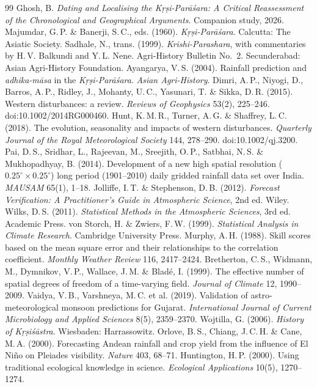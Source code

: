 \documentclass[11pt,a4paper]{article}
\newcommand{\skt}[1]{\textcolor{skt}{\textit{#1}}}
\begin{document}
\begin{thebibliography}{99}\small
{} Ghosh, B. \textit{Dating and Localising the Kṛṣi-Parāśara: A Critical Reassessment of the Chronological and Geographical Arguments}. Companion study, 2026.
 Majumdar, G.\,P. \& Banerji, S.\,C., eds. (1960). \textit{Kṛṣi-Parāśara}. Calcutta: The Asiatic Society.
 Sadhale, N., trans. (1999). \textit{Krishi-Parashara}, with commentaries by H.\,V. Balkundi and Y.\,L. Nene. Agri-History Bulletin No.~2. Secunderabad: Asian Agri-History Foundation.
 Ayangarya, V.\,S. (2004). Rainfall prediction and \skt{adhika-māsa} in the \textit{Kṛṣi-Parāśara}. \textit{Asian Agri-History}.
 Dimri, A.\,P., Niyogi, D., Barros, A.\,P., Ridley, J., Mohanty, U.\,C., Yasunari, T. \& Sikka, D.\,R. (2015). Western disturbances: a review. \textit{Reviews of Geophysics} 53(2), 225--246. doi:10.1002/2014RG000460.
 Hunt, K.\,M.\,R., Turner, A.\,G. \& Shaffrey, L.\,C. (2018). The evolution, seasonality and impacts of western disturbances. \textit{Quarterly Journal of the Royal Meteorological Society} 144, 278--290. doi:10.1002/qj.3200.
 Pai, D.\,S., Sridhar, L., Rajeevan, M., Sreejith, O.\,P., Satbhai, N.\,S. \& Mukhopadhyay, B. (2014). Development of a new high spatial resolution ($0.25^\circ\times0.25^\circ$) long period (1901--2010) daily gridded rainfall data set over India. \textit{MAUSAM} 65(1), 1--18.
 Jolliffe, I.\,T. \& Stephenson, D.\,B. (2012). \textit{Forecast Verification: A Practitioner's Guide in Atmospheric Science}, 2nd ed. Wiley.
 Wilks, D.\,S. (2011). \textit{Statistical Methods in the Atmospheric Sciences}, 3rd ed. Academic Press.
 von Storch, H. \& Zwiers, F.\,W. (1999). \textit{Statistical Analysis in Climate Research}. Cambridge University Press.
 Murphy, A.\,H. (1988). Skill scores based on the mean square error and their relationships to the correlation coefficient. \textit{Monthly Weather Review} 116, 2417--2424.
 Bretherton, C.\,S., Widmann, M., Dymnikov, V.\,P., Wallace, J.\,M. \& Bladé, I. (1999). The effective number of spatial degrees of freedom of a time-varying field. \textit{Journal of Climate} 12, 1990--2009.
 Vaidya, V.\,B., Varshneya, M.\,C. et al. (2019). Validation of astro-meteorological monsoon predictions for Gujarat. \textit{International Journal of Current Microbiology and Applied Sciences} 8(5), 2359--2370.
 Wojtilla, G. (2006). \textit{History of Kṛṣiśāstra}. Wiesbaden: Harrassowitz.
 Orlove, B.\,S., Chiang, J.\,C.\,H. \& Cane, M.\,A. (2000). Forecasting Andean rainfall and crop yield from the influence of El Niño on Pleiades visibility. \textit{Nature} 403, 68--71.
 Huntington, H.\,P. (2000). Using traditional ecological knowledge in science. \textit{Ecological Applications} 10(5), 1270--1274.
\end{thebibliography}
\end{document}
